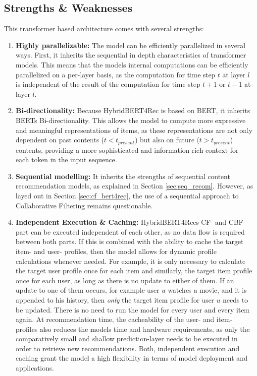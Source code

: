 \documentclass{Academic}
\begin{document}
        \subsection{Strengths \& Weaknesses}\label{sec:str_weak}
        This transformer based architecture comes with several strengths:
        \begin{enumerate}
            \item \textbf{Highly parallelizable:} The model can be efficiently parallelized in several ways. First, it inherits the sequential in depth characteristics of transformer models. This means that the models internal computations can be efficiently parallelized on a per-layer basis, as the computation for time step $t$ at layer $l$ is independent of the result of the computation for time step $t+1$ or $t-1$ at layer $l$.
            \item \textbf{Bi-directionality:} Because HybridBERT4Rec is based on BERT, it inherits BERTs Bi-directionality. This allows the model to compute more expressive and meaningful representations of items, as these representations are not only dependent on past contents ($t < t_{present}$) but also on future ($t > t_{present}$) contents, providing a more sophisticated and information rich context for each token in the input sequence.
            \item \textbf{Sequential modelling:} It inherits the strengths of sequential content recommendation models, as explained in Section \ref{sec:seq_recom}. However, as layed out in Section \ref{sec:cf_bert4rec}, the use of a sequential approach to Collaborative Filtering remains questionable.
            \item \textbf{Independent Execution \& Caching:} HybridBERT4Recs CF- and CBF-part can be executed independent of each other, as no data flow is required between both parts. If this is combined with the ability to cache the target item- and user- profiles, then the model allows for dynamic profile calculations whenever needed. For example, it is only necessary to calculate the target user profile once for each item and similarly, the target item profile once for each user, as long as there is no update to either of them. If an update to one of them occurs, for example user $u$ watches a movie, and it is appended to his history, then \textit{only} the target item profile for user $u$ needs to be updated. There is no need to run the model for every user and every item again. At recommendation time, the cacheability of the user- and item-profiles also reduces the models time and hardware requirements, as only the comparatively small and shallow prediction-layer needs to be executed in order to retrieve new recommendations. Both, independent execution and caching grant the model a high flexibility in terms of model deployment and applications.
        \end{enumerate}
\end{document}
